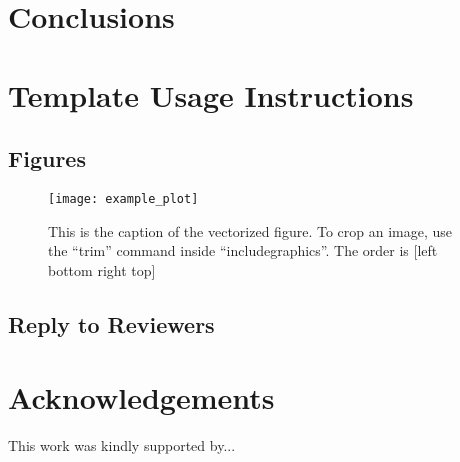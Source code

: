 \documentclass[journal]{IEEEtran}
\begin{document}
\section{Conclusions}
\label{sec_conclusions}

\section{Template Usage Instructions}
\subsection{Figures} \label{sec_figures}


\begin{figure}[t] %
     \centering
     \texttt{[image: example\_plot]}
     \caption{This is the caption of the vectorized figure. To crop an image, use the ``trim'' command inside ``includegraphics''. The order is [left bottom right top]}
     \label{fig_MyLabel}
  \end{figure}

\subsection{Reply to Reviewers}\label{sec_reply}


\section*{Acknowledgements}
This work was kindly supported by... 









\newpage
\vfill
\end{document}
